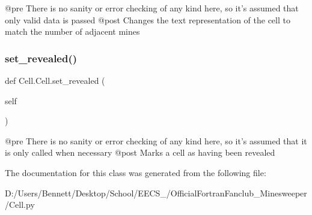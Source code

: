 \begin{DoxyVerb}@pre    There is no sanity or error checking of any kind here, so
it's assumed that only valid data is passed
    @post   Changes the text representation of the cell to match the
number of adjacent mines
\end{DoxyVerb}
 \mbox{\label{class_cell_1_1_cell_a3edb2b41e0679a26da351daeaf6c20ed}} 
\subsubsection{\texorpdfstring{set\+\_\+revealed()}{set\_revealed()}}
{\footnotesize\ttfamily def Cell.\+Cell.\+set\+\_\+revealed (\begin{DoxyParamCaption}\item[{}]{self }\end{DoxyParamCaption})}

\begin{DoxyVerb}@pre    There is no sanity or error checking of any kind here, so
it's assumed that it is only called when necessary
    @post   Marks a cell as having been revealed
\end{DoxyVerb}
 

The documentation for this class was generated from the following file\+:\begin{DoxyCompactItemize}
\item 
D\+:/\+Users/\+Bennett/\+Desktop/\+School/\+E\+E\+C\+S\+\_/\+Official\+Fortran\+Fanclub\+\_\+\+Minesweeper/Cell.\+py\end{DoxyCompactItemize}
